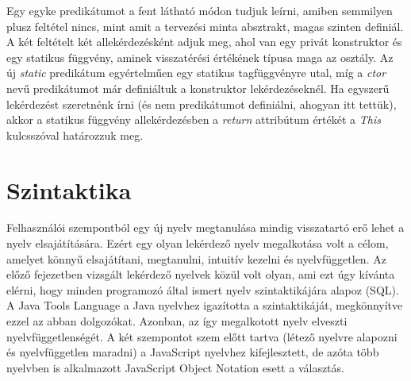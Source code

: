 \documentclass[a4paper,12pt]{report}
\begin{document}
\par Egy egyke predikátumot a fent látható módon tudjuk leírni, amiben semmilyen plusz feltétel nincs, mint amit a tervezési minta absztrakt, magas szinten definiál. A két feltételt két allekérdezésként adjuk meg, ahol van egy privát konstruktor és egy statikus függvény, aminek visszatérési értékének típusa maga az osztály. Az új \textit{static} predikátum egyértelműen egy statikus tagfüggvényre utal, míg a \textit{ctor} nevű predikátumot már definiáltuk a konstruktor lekérdezéseknél. Ha egyszerű lekérdezést szeretnénk írni (és nem predikátumot definiálni, ahogyan itt tettük), akkor a statikus függvény allekérdezésben a \textit{return} attribútum értékét a \textit{This} kulcsszóval határozzuk meg.
\section{Szintaktika}
Felhasználói szempontból egy új nyelv megtanulása mindig visszatartó erő lehet a nyelv elsajátítására. Ezért egy olyan lekérdező nyelv megalkotása volt a célom, amelyet könnyű elsajátítani, megtanulni, intuitív kezelni és nyelvfüggetlen. Az előző fejezetben vizsgált lekérdező nyelvek közül volt olyan, ami ezt úgy kívánta elérni, hogy minden programozó által ismert nyelv szintaktikájára alapoz (SQL). A Java Tools Language a Java nyelvhez igazította a szintaktikáját, megkönnyítve ezzel az abban dolgozókat. Azonban, az így megalkotott nyelv elveszti nyelvfüggetlenségét. A két szempontot szem előtt tartva (létező nyelvre alapozni és nyelvfüggetlen maradni) a JavaScript nyelvhez kifejlesztett, de azóta több nyelvben is alkalmazott JavaScript Object Notation esett a választás.
\end{document}
